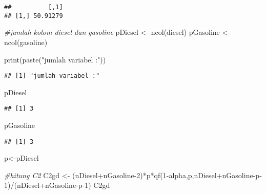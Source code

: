 \documentclass[
]{article}
\newenvironment{Shaded}{\begin{snugshade}}{\end{snugshade}}
\newcommand{\CommentTok}[1]{\textcolor[rgb]{0.56,0.35,0.01}{\textit{#1}}}
\newcommand{\DecValTok}[1]{\textcolor[rgb]{0.00,0.00,0.81}{#1}}
\newcommand{\FunctionTok}[1]{\textcolor[rgb]{0.00,0.00,0.00}{#1}}
\newcommand{\NormalTok}[1]{#1}
\newcommand{\OtherTok}[1]{\textcolor[rgb]{0.56,0.35,0.01}{#1}}
\newcommand{\SpecialCharTok}[1]{\textcolor[rgb]{0.00,0.00,0.00}{#1}}
\newcommand{\StringTok}[1]{\textcolor[rgb]{0.31,0.60,0.02}{#1}}
\begin{document}
\begin{verbatim}
##          [,1]
## [1,] 50.91279
\end{verbatim}

\begin{Shaded}
\begin{Highlighting}[]
\CommentTok{\#jumlah kolom diesel dan gasoline}
\NormalTok{pDiesel }\OtherTok{\textless{}{-}} \FunctionTok{ncol}\NormalTok{(diesel)}
\NormalTok{pGasoline }\OtherTok{\textless{}{-}} \FunctionTok{ncol}\NormalTok{(gasoline)}

\FunctionTok{print}\NormalTok{(}\FunctionTok{paste}\NormalTok{(}\StringTok{"jumlah variabel :"}\NormalTok{))}
\end{Highlighting}
\end{Shaded}

\begin{verbatim}
## [1] "jumlah variabel :"
\end{verbatim}

\begin{Shaded}
\begin{Highlighting}[]
\NormalTok{pDiesel}
\end{Highlighting}
\end{Shaded}

\begin{verbatim}
## [1] 3
\end{verbatim}

\begin{Shaded}
\begin{Highlighting}[]
\NormalTok{pGasoline}
\end{Highlighting}
\end{Shaded}

\begin{verbatim}
## [1] 3
\end{verbatim}

\begin{Shaded}
\begin{Highlighting}[]
\NormalTok{p}\OtherTok{\textless{}{-}}\NormalTok{pDiesel}
\end{Highlighting}
\end{Shaded}

\begin{Shaded}
\begin{Highlighting}[]
\CommentTok{\#hitung C2}
\NormalTok{C2gd }\OtherTok{\textless{}{-}}\NormalTok{ (nDiesel}\SpecialCharTok{+}\NormalTok{nGasoline}\DecValTok{{-}2}\NormalTok{)}\SpecialCharTok{*}\NormalTok{p}\SpecialCharTok{*}\FunctionTok{qf}\NormalTok{(}\DecValTok{1}\SpecialCharTok{{-}}\NormalTok{alpha,p,nDiesel}\SpecialCharTok{+}\NormalTok{nGasoline}\SpecialCharTok{{-}}\NormalTok{p}\DecValTok{{-}1}\NormalTok{)}\SpecialCharTok{/}\NormalTok{(nDiesel}\SpecialCharTok{+}\NormalTok{nGasoline}\SpecialCharTok{{-}}\NormalTok{p}\DecValTok{{-}1}\NormalTok{)}
\NormalTok{C2gd}
\end{Highlighting}
\end{Shaded}
\end{document}
